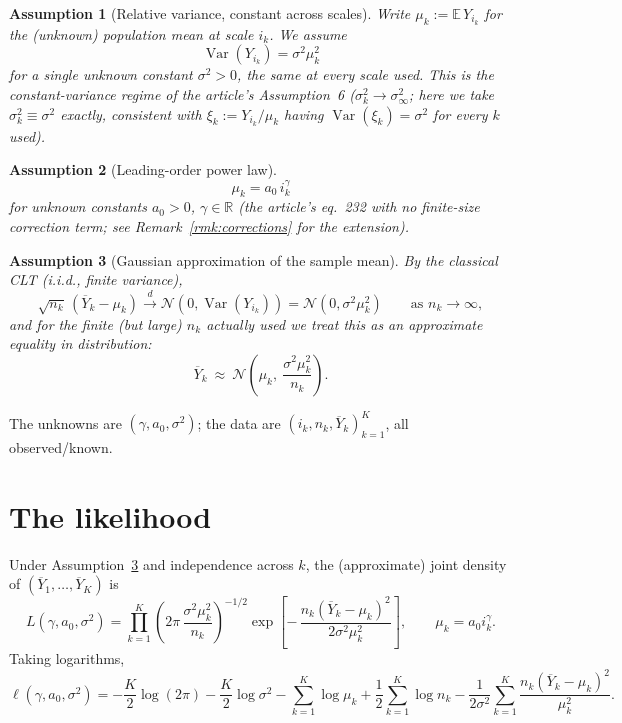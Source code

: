 \documentclass[11pt]{article}
\newtheorem{assumption}{Assumption}
\newcommand{\E}{\mathbb{E}}
\newcommand{\Var}{\operatorname{Var}}
\newcommand{\dto}{\xrightarrow{d}}
\begin{document}
\begin{assumption}[Relative variance, constant across scales]
\label{ass:relvar}
Write $\mu_k := \E\, Y_{i_k}$ for the (unknown) population mean at scale
$i_k$. We assume
\[
  \Var(Y_{i_k}) = \sigma^2 \mu_k^2
\]
for a single unknown constant $\sigma^2 > 0$, the same at every scale used.
This is the constant-variance regime of the article's Assumption~6
($\sigma_k^2 \to \sigma_\infty^2$; here we take $\sigma_k^2 \equiv \sigma^2$
exactly, consistent with $\xi_k := Y_{i_k}/\mu_k$ having $\Var(\xi_k) =
\sigma^2$ for every $k$ used).
\end{assumption}

\begin{assumption}[Leading-order power law]
\label{ass:powerlaw}
\[
  \mu_k = a_0\, i_k^{\gamma}
\]
for unknown constants $a_0 > 0$, $\gamma \in \mathbb{R}$ (the article's
eq.~232 with no finite-size correction term; see
Remark~\ref{rmk:corrections} for the extension).
\end{assumption}

\begin{assumption}[Gaussian approximation of the sample mean]
\label{ass:clt}
By the classical CLT (i.i.d., finite variance),
\[
  \sqrt{n_k}\,(\overline{Y}_k - \mu_k) \dto \mathcal{N}(0, \Var(Y_{i_k}))
  = \mathcal{N}(0, \sigma^2 \mu_k^2) \qquad \text{as } n_k \to \infty,
\]
and for the finite (but large) $n_k$ actually used we treat this as an
approximate equality in distribution:
\[
  \overline{Y}_k \ \approx\ \mathcal{N}\!\left(\mu_k,\ \frac{\sigma^2 \mu_k^2}{n_k}\right).
\]
\end{assumption}

The unknowns are $(\gamma, a_0, \sigma^2)$; the data are
$(i_k, n_k, \overline{Y}_k)_{k=1}^K$, all observed/known.

\section{The likelihood}

Under Assumption~\ref{ass:clt} and independence across $k$, the (approximate)
joint density of $(\overline{Y}_1,\dots,\overline{Y}_K)$ is
\[
  L(\gamma, a_0, \sigma^2)
  = \prod_{k=1}^K
    \left(2\pi\,\frac{\sigma^2\mu_k^2}{n_k}\right)^{-1/2}
    \exp\!\left[-\,\frac{n_k(\overline{Y}_k - \mu_k)^2}{2\sigma^2 \mu_k^2}\right],
  \qquad \mu_k = a_0 i_k^\gamma.
\]
Taking logarithms,
\begin{equation}
\label{eq:loglik}
  \ell(\gamma, a_0, \sigma^2)
  = -\frac{K}{2}\log(2\pi) - \frac{K}{2}\log\sigma^2
    - \sum_{k=1}^K \log \mu_k + \frac{1}{2}\sum_{k=1}^K \log n_k
    - \frac{1}{2\sigma^2}\sum_{k=1}^K \frac{n_k(\overline{Y}_k-\mu_k)^2}{\mu_k^2}.
\end{equation}
\end{document}

